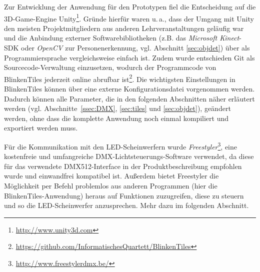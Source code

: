 \label{ssec:entscheidungen}

Zur Entwicklung der Anwendung für den Prototypen fiel die Entscheidung auf die 3D-Game-Engine Unity\footnote{\url{http://www.unity3d.com}}. Gründe hierfür waren u.\,a., dass der Umgang mit Unity den meisten Projektmitgliedern aus anderen Lehrveranstaltungen geläufig war und die Anbindung externer Softwarebibliotheken (z.B. das \emph{Microsoft Kinect}-SDK oder \emph{OpenCV} zur Personenerkennung, vgl. Abschnitt \ref{sec:objdet}) über \CS{} als Programmiersprache vergleichsweise einfach ist. Zudem wurde entschieden Git als Sourcecode-Verwaltung einzusetzen, wodurch der Programmcode von BlinkenTiles jederzeit online abrufbar ist\footnote{\url{https://github.com/InformatischesQuartett/BlinkenTiles}}. Die wichtigsten Einstellungen in BlinkenTiles können über eine externe Konfigurationsdatei vorgenommen werden. Dadurch können alle Parameter, die in den folgenden Abschnitten näher erläutert werden (vgl. Abschnitte~\ref{ssec:DMX}, \ref{sec:tiles} und \ref{sec:objdet}), geändert werden, ohne dass die komplette Anwendung noch einmal kompiliert und exportiert werden muss.

Für die Kommunikation mit den LED-Scheinwerfern wurde \emph{Freestyler}\footnote{\url{http://www.freestylerdmx.be/}}, eine kostenfreie und umfangreiche DMX-Lichtsteuerungs-Software verwendet, da diese für das verwendete DMX512-Interface in der Produktbeschreibung empfohlen wurde und einwandfrei kompatibel ist. Außerdem bietet Freestyler die Möglichkeit per Befehl problemlos aus anderen Programmen (hier die BlinkenTiles-Anwendung) heraus auf Funktionen zuzugreifen, diese zu steuern und so die LED-Scheinwerfer anzusprechen. Mehr dazu im folgenden Abschnitt.

